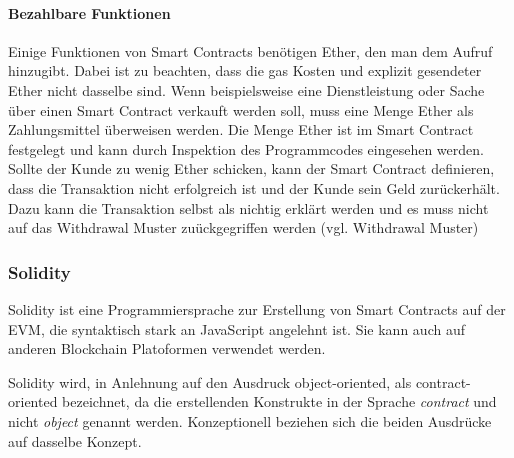 \paragraph{Bezahlbare Funktionen}
Einige Funktionen von Smart Contracts benötigen Ether, den man dem Aufruf hinzugibt. Dabei ist zu beachten, dass die gas Kosten und explizit gesendeter Ether nicht dasselbe sind. Wenn beispielsweise eine Dienstleistung oder Sache über einen Smart Contract verkauft werden soll, muss eine Menge Ether als Zahlungsmittel überweisen werden. Die Menge Ether ist im Smart Contract festgelegt und kann durch Inspektion des Programmcodes eingesehen werden. Sollte der Kunde zu wenig Ether schicken, kann der Smart Contract definieren, dass die Transaktion nicht erfolgreich ist und der Kunde sein Geld zurückerhält. Dazu kann die Transaktion selbst als nichtig erklärt werden und es muss nicht auf das Withdrawal Muster zuückgegriffen werden (vgl. Withdrawal Muster)

\subsubsection{Solidity}
Solidity ist eine Programmiersprache zur Erstellung von Smart Contracts auf der \acrfull{EVM}, die syntaktisch stark an JavaScript angelehnt ist. Sie kann auch auf anderen Blockchain Platoformen verwendet werden.\cite{cryptocoinnews.com/smart-contract-bitcoin,github.com/hyperledger/burrow}

Solidity wird, in Anlehnung auf den Ausdruck object-oriented, als contract-oriented bezeichnet, da die erstellenden Konstrukte in der Sprache \emph{contract} und nicht \emph{object} genannt werden. Konzeptionell beziehen sich die beiden Ausdrücke auf dasselbe Konzept.

